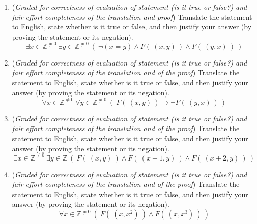 \documentclass[12pt, oneside]{article}
\begin{document}
\begin{enumerate}[labelindent=0pt, leftmargin=0pt]
\begin{enumerate}
    \begin{quote}
      To disprove the statement, we need to find a counterexample. We choose $2$, a nonzero
      integer so in the domain. We need to show that $\lnot F(~(2,1)~)$. By definition of the predicate $F$, we 
      can rewrite this goal as $1 \textbf{ mod } 2 \neq 0$. By definition of integer division, since 
      $1 = 0 \cdot 2  + 1$ (and $0 \leq 1 < 2$), $1 \textbf { mod } 2 = 1$ which is nonzero so the counterexample works to 
      disprove the original statement.
       $\square$
    \end{quote}
    
    {\it Hint: it may be useful to 
    identify the key words in the proof that indicate proof strategies.}
    
    \item ({\it Graded for correctness of evaluation of statement (is it true or false?) and fair effort completeness of the translation and proof}) 
    Translate the statement to English, state whether is it true or false, and then justify your answer (by proving the statement or its negation).
    $$\exists x \in \mathbb{Z}^{\neq 0}~ \exists y \in \mathbb{Z}^{\neq 0} ~(~\lnot(x = y) \land F(~(x,y)~) \land F(~(y,x)~)~)$$
    
    \item ({\it Graded for correctness of evaluation of statement (is it true or false?) 
    and fair effort completeness of the translation and of the proof}) 
    Translate the statement to English, state whether is it true or false, and then justify your answer (by proving the statement or its negation).
    $$\forall x \in \mathbb{Z}^{\neq 0}~ \forall y \in \mathbb{Z}^{\neq 0} ~(~F(~(x,y)~) \to \lnot F(~(y,x)~)~)$$
    
    \item ({\it Graded for correctness of evaluation of statement (is it true or false?) 
    and fair effort completeness of the translation and of the proof}) 
    Translate the statement to English, state whether is it true or false, and then justify your answer (by proving the statement or its negation).
    $$\exists x \in \mathbb{Z}^{\neq 0}~ \exists y \in \mathbb{Z}~(~F(~(x,y)~) \land  F(~(x+1, y)~) \land F(~(x+2, y)~)~)$$
    
    \item ({\it Graded for correctness of evaluation of statement (is it true or false?) 
    and fair effort completeness of the translation and of the proof}) 
    Translate the statement to English, state whether is it true or false, and then justify your answer (by proving the statement or its negation).
    $$\forall x \in \mathbb{Z}^{\neq 0}~ (~F(~(x,x^2)~) \land F(~(x,x^3)~)~)$$
    

\end{enumerate}
\end{enumerate}
\end{document}
